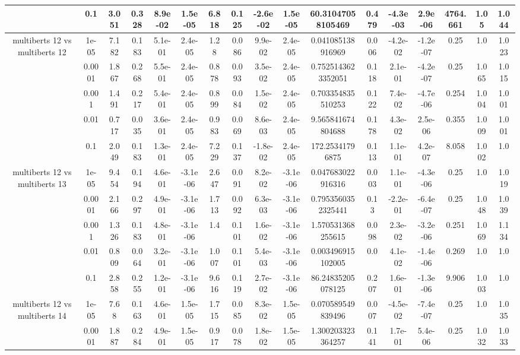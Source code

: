 \begin{tabular}{|c|c|c|c|c|c|c|c|c|c|c|c|c|c|c|c|c|}
 & 0.1 & 3.051 & 0.328 & 8.9e-02 & 1.5e-05 & 6.818 & 0.125 & -2.6e-02 & 1.5e-05 & 60.31047058105469 & 0.479 & -4.3e-03 & 2.9e-06 & 4764.661 & 1.05 & 1.044 \\
\hline
\multirow{5}{*}{multiberts 12 vs multiberts 12} & 1e-05 & 7.182 & 0.183 & 5.1e-01 & 2.4e-05 & 1.28 & 0.086 & 9.9e-02 & 2.4e-05 & 0.041085138916969 & 0.006 & -4.2e-02 & -1.2e-07 & 0.25 & 1.0 & 1.023 \\
 & 0.0001 & 1.867 & 0.268 & 5.5e-01 & 2.4e-05 & 0.878 & 0.093 & 3.5e-02 & 2.4e-05 & 0.7525143623352051 & 0.118 & 2.1e-01 & -4.2e-07 & 0.25 & 1.065 & 1.015 \\
 & 0.001 & 1.491 & 0.217 & 5.4e-01 & 2.4e-05 & 0.899 & 0.084 & 1.5e-02 & 2.4e-05 & 0.703354835510253 & 0.122 & 7.4e-02 & -4.7e-06 & 0.254 & 1.004 & 1.001 \\
 & 0.01 & 0.717 & 0.035 & 3.6e-01 & 2.4e-05 & 0.983 & 0.069 & 8.6e-03 & 2.4e-05 & 9.565841674804688 & 0.178 & 4.3e-02 & 2.5e-06 & 0.355 & 1.009 & 1.001 \\
 & 0.1 & 2.049 & 0.183 & 1.3e-01 & 2.4e-05 & 7.229 & 0.137 & -1.8e-02 & 2.4e-05 & 172.25341796875 & 0.113 & 1.1e-01 & 4.2e-07 & 8.058 & 1.002 & 1.0 \\
\hline
\multirow{5}{*}{multiberts 12 vs multiberts 13} & 1e-05 & 9.454 & 0.194 & 4.6e-01 & -3.1e-06 & 2.647 & 0.091 & 8.2e-02 & -3.1e-06 & 0.047683022916316 & 0.003 & 1.1e-01 & -4.3e-06 & 0.25 & 1.0 & 1.019 \\
 & 0.0001 & 2.166 & 0.297 & 4.9e-01 & -3.1e-06 & 1.713 & 0.092 & 6.3e-03 & -3.1e-06 & 0.7953560352325441 & 0.13 & -2.2e-01 & -6.4e-07 & 0.25 & 1.048 & 1.039 \\
 & 0.001 & 1.326 & 0.183 & 4.8e-01 & -3.1e-06 & 1.4 & 0.101 & 1.6e-02 & -3.1e-06 & 1.570531368255615 & 0.098 & 2.3e-02 & -3.2e-06 & 0.251 & 1.069 & 1.134 \\
 & 0.01 & 0.809 & 0.064 & 3.2e-01 & -3.1e-06 & 1.007 & 0.101 & 5.4e-03 & -3.1e-06 & 0.003496915102005 & 0.0 & 4.1e-02 & -1.4e-06 & 0.269 & 1.0 & 1.0 \\
 & 0.1 & 2.858 & 0.255 & 1.2e-01 & -3.1e-06 & 9.616 & 0.119 & 2.7e-02 & -3.1e-06 & 86.24835205078125 & 0.207 & 1.6e-01 & -1.3e-06 & 9.906 & 1.003 & 1.0 \\
\hline
\multirow{5}{*}{multiberts 12 vs multiberts 14} & 1e-05 & 7.68 & 0.163 & 4.6e-01 & 1.5e-05 & 1.715 & 0.085 & 8.3e-02 & 1.5e-05 & 0.070589549839496 & 0.007 & -4.5e-02 & -7.4e-07 & 0.25 & 1.0 & 1.035 \\
 & 0.0001 & 1.887 & 0.284 & 4.9e-01 & 1.5e-05 & 0.917 & 0.078 & 1.8e-02 & 1.5e-05 & 1.300203323364257 & 0.141 & 1.7e-01 & 5.4e-06 & 0.25 & 1.032 & 1.033 \\

\end{tabular}
